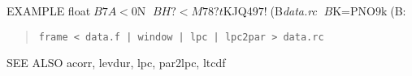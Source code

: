 \newpage
{}

\begin{qsection}{EXAMPLE}
float$B7A<0$N%
$BH?<M78?t$KJQ49$7!$(B{\em data.rc} $B$K=PNO$9$k(B:
\begin{quote}
 \verb!frame < data.f | window | lpc | lpc2par > data.rc!
\end{quote} 
\end{qsection}

\begin{qsection}{SEE ALSO}
 acorr, levdur, lpc, par2lpc, ltcdf
\end{qsection}
